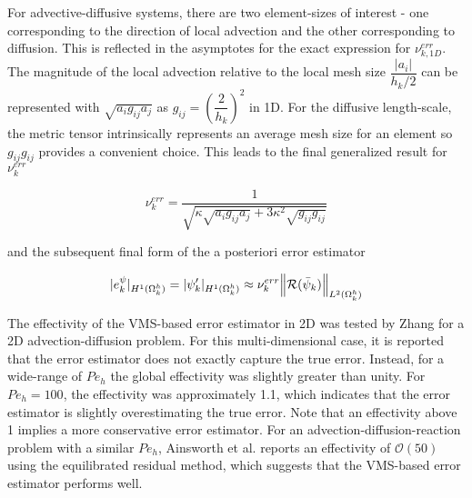 

For advective-diffusive systems, there are two element-sizes of interest - one corresponding to the direction of local advection and the other corresponding to diffusion.
This is reflected in the asymptotes for the exact expression for $\nu^{err}_{k,1D}$. %
The magnitude of the local advection relative to the local mesh size $\dfrac{|a_i|}{h_k/2}$ can be represented with $\sqrt{a_i g_{ij} a_j}$ as $g_{ij} = \left(\dfrac{2}{h_k}\right)^2$ in 1D.
For the diffusive length-scale, the metric tensor intrinsically represents an average mesh size for an element so $g_{ij}g_{ij}$ provides a convenient choice.
This leads to the final generalized result for $\nu^{err}_k$

\begin{equation}
    \nu^{err}_{k} = \dfrac{1}{\sqrt{ \kappa\sqrt{a_i g_{ij} a_j} + 3\kappa^2\sqrt{g_{ij}g_{ij}}  }  }
\end{equation}

\noindent and the subsequent final form of the a posteriori error estimator

\begin{equation}
      |e^{\psi}_k|_{H^{1}(\Omega^h_k)} = |\psi'_k|_{H^1(\Omega^h_k)} \approx \nu^{err}_{k} \norm{\mathcal{R}(\bar{\psi}_k)}_{L^2(\Omega^h_k)}
      \label{eq:VMSerr}
\end{equation}

The effectivity of the VMS-based error estimator in 2D was tested by Zhang \cite{zhang19} for a 2D advection-diffusion problem. For this multi-dimensional case, it is reported that the error estimator does not exactly capture the true error. Instead, for a wide-range of $Pe_h$ the global effectivity was slightly greater than unity.   
For $Pe_h=100$, the effectivity was approximately 1.1, which indicates that the error estimator is slightly overestimating the true error.
Note that an effectivity above 1 implies a more conservative error estimator. 
For an advection-diffusion-reaction problem with a similar $Pe_h$, Ainsworth et al. \cite{ainsworth2013fully} reports an effectivity of $\mathcal{O}(50)$ using the equilibrated residual method, which suggests that the VMS-based error estimator performs well.

 


